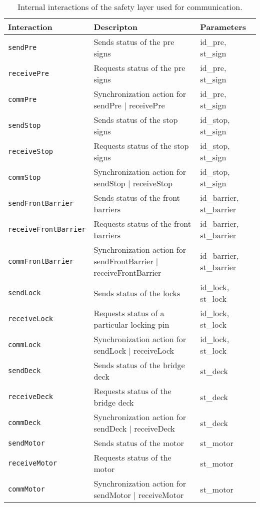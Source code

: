\begin{table}[htb]%
\begin{tabular}{lll}
      \textbf{Interaction} &	\textbf{Descripton}	&	\textbf{Parameters}\\
      \hline
      \texttt{sendPre} & Sends status of the pre signs & id\_pre, st\_sign\\
      \texttt{receivePre} & Requests status of the pre signs & id\_pre, st\_sign\\
      \texttt{commPre} & Synchronization action for sendPre $\mid$ receivePre & id\_pre, st\_sign\\

      \texttt{sendStop} & Sends status of the stop signs & id\_stop, st\_sign\\
      \texttt{receiveStop} & Requests status of the stop signs & id\_stop, st\_sign\\
      \texttt{commStop} & Synchronization action for sendStop $\mid$ receiveStop & id\_stop, st\_sign\\

      \texttt{sendFrontBarrier} & Sends status of the front barriers & id\_barrier, st\_barrier\\
      \texttt{receiveFrontBarrier} & Requests status of the front barriers & id\_barrier, st\_barrier\\
      \texttt{commFrontBarrier} & Synchronization action for sendFrontBarrier $\mid$ receiveFrontBarrier & id\_barrier, st\_barrier\\

      \texttt{sendLock} & Sends status of the locks & id\_lock, st\_lock\\
      \texttt{receiveLock} & Requests status of a particular locking pin & id\_lock, st\_lock\\
      \texttt{commLock} & Synchronization action for sendLock $\mid$ receiveLock & id\_lock, st\_lock\\

      \texttt{sendDeck} & Sends status of the bridge deck & st\_deck\\
      \texttt{receiveDeck} & Requests status of the bridge deck & st\_deck\\
      \texttt{commDeck} & Synchronization action for sendDeck $\mid$ receiveDeck & st\_deck\\

      \texttt{sendMotor} & Sends status of the motor & st\_motor\\
      \texttt{receiveMotor} & Requests status of the motor & st\_motor\\
      \texttt{commMotor} & Synchronization action for sendMotor $\mid$ receiveMotor & st\_motor\\
\end{tabular}
\caption{Internal interactions of the safety layer used for communication.}
\label{tab:process}
\end{table}
